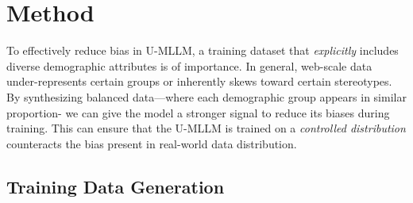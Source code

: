 \vspace{-1em}
\section{Method}
\label{sec:method}

To effectively reduce bias in U-MLLM, a training dataset that \emph{explicitly} includes diverse demographic attributes is of importance. In general, web-scale data under-represents certain groups or inherently skews toward certain stereotypes. By synthesizing balanced data—where each demographic group appears in similar proportion- we can give the model a stronger signal to reduce its biases during training. This can ensure that the U-MLLM is trained on a \emph{controlled distribution} counteracts the bias present in real-world data distribution.

\subsection{Training Data Generation}
\label{subsection: training data generation}

